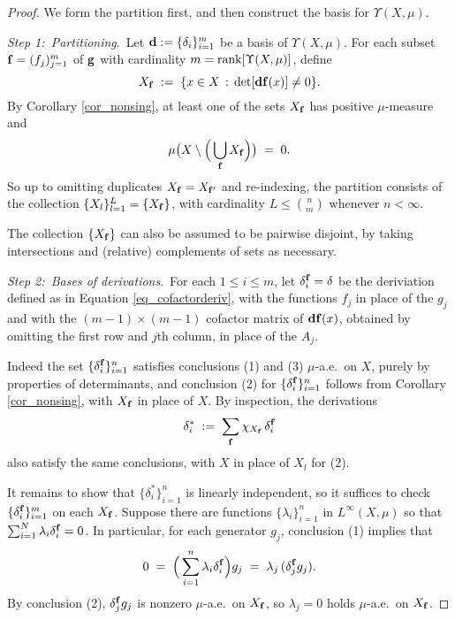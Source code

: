 \documentclass[reqno]{amsart}
\theoremstyle{plain}
\theoremstyle{definition}
\theoremstyle{remark}
\numberwithin{equation}{section}
\renewcommand{\d}{\delta}
\newcommand{\U}{\Upsilon}
\begin{document}
\begin{proof}
We form the partition first, and then construct the basis for $\U(X,\mu)$.

\vspace{.05in}
{\em Step 1:\ Partitioning}.\
Let ${\bf d} := \{\d_i\}_{i=1}^m$ be a basis of $\U(X,\mu)$.  For each subset ${\bf f} = (f_j)_{j=1}^m$ of ${\bf g}$ with cardinality  $m = {\rm rank}[\U(X,\mu)]$, define
$$
X_{\bf f} \;:=\; \{ x \in X \,:\, \det[{\bf df}(x)] \neq 0 \}.
$$
By Corollary \ref{cor_nonsing}, at least one of the sets $X_{\bf f}$ has positive $\mu$-measure and
$$
\mu\big(X \setminus \Big( \bigcup_{\bf f} X_{\bf f}\Big) \big) \;=\; 0.
$$
So up to omitting duplicates $X_{\bf f} = X_{\bf f'}$ and re-indexing, the partition consists of the collection $\{X_l\}_{l=1}^L = \{X_{\bf f}\}$, with cardinality $L \leq \binom{n}{m}$ whenever $n < \infty$.

The collection $\{X_{\bf f}\}$ can also be assumed to be pairwise disjoint, by taking intersections and (relative) complements of sets as necessary.

\vspace{.05in}

{\em Step 2:\ Bases of derivations}.\ For each $1 \leq i \leq m$, let $\d_i^{\bf f} = \d$ be the deriviation defined as in Equation \eqref{eq_cofactorderiv}, with the functions $f_j$ in place of the $g_j$ and with the $(m-1) \times (m-1)$ cofactor matrix of ${\bf df}(x)$, obtained by omitting the first row and $j$th column, in place of the $A_j$.

Indeed the set $\{\d_i^{\bf f}\}_{i=1}^n$ satisfies conclusions (1) and (3) $\mu$-a.e.\ on $X$, purely by properties of determinants, and conclusion (2) for $\{\d_i^{\bf f}\}_{i=1}^n$ follows from Corollary \ref{cor_nonsing}, with $X_{\bf f}$ in place of $X$.  By inspection, the derivations
$$
\d_i^* \;:=\; \sum_{\bf f} \chi_{X_{\bf f}} \, \d_i^{\bf f}
$$
also satisfy the same conclusions, with $X$ in place of $X_l$ for (2).

It remains to show that $\{\d_i^*\}_{i=1}^n$ is linearly independent, so it suffices to check $\{\d_i^{\bf f}\}_{i=1}^m$ on each $X_{\bf f}$.  Suppose there are functions $\{\lambda_i\}_{i=1}^n$ in $L^\infty(X,\mu)$ so that $\sum_{i=1}^N \lambda_i \d_i^{\bf f} = 0$.  In particular, for each generator $g_j$, conclusion (1) implies that
$$
0 \;=\;
\Big(\sum_{i=1}^n \lambda_i \d_i^{\bf f} \Big)g_j \;=\;
\lambda_j \, (\d_j^{\bf f} g_j).
$$
By conclusion (2), $\d_j^{\bf f} g_j$ is nonzero $\mu$-a.e.\ on $X_{\bf f}$, so $\lambda_j = 0$ holds $\mu$-a.e.\ on $X_{\bf f}$.
\end{proof}
\end{document}

